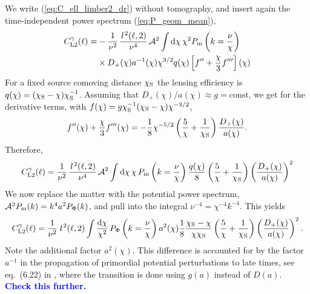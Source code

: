 \documentclass[fleqn,usenatbib]{mnras} %
\newcommand{\ellbar}{\hbox{\it \l}\,}
\newcommand{\pref}{{\cal A}}
\newcommand{\mk}[1]{{\bf\textcolor{blue}{#1}}}
\begin{document}
\begin{appendix}
We write (\ref{eq:C_ell_limber2_dr}) without tomography, and insert again the
time-independent power spectrum (\ref{eq:P_geom_mean}),
%
\begin{align}
  C^\gamma_{{\rm L2}}(\ell) = & - \frac 1 {\nu^2} \, \frac{\ellbar^2(\ell, 2)}{\nu^4} \, \pref^2
    \int {\rm d} \chi \, \chi^{2} P_{\rm m}\left(k = \frac\nu\chi\right)
    \nonumber \\
    & \times D_+(\chi) a^{-1}(\chi) \chi^{3/2} q(\chi) \left[ f^{\prime\prime} 
      + \frac{\chi}{3} f^{\prime\prime\prime} 
    \right](\chi)
  \label{eq:C_ell_limber2_dr_notomo}
\end{align}
%
For a fixed source comoving distance $\chi_{\rm S}$ the lensing efficiency is
$q(\chi) = (\chi_{\rm S} - \chi) \chi_{\rm S}^{-1}$. Assuming that
$D_+(\chi)/a(\chi) \approx g = \mbox{const}$, we get for the derivative terms,
with $f(\chi) = g \chi_{\rm S}^{-1} (\chi_{\rm S} - \chi) \chi^{-3/2}$,
%
\begin{equation}
  f^{\prime\prime}(\chi) + \frac{\chi}{3} f^{\prime\prime\prime}(\chi)
    = - \frac 1 8 \chi^{-5/2} \left( \frac 5 \chi
          + \frac 1 {\chi_{\rm S}} \right) \frac{D_+(\chi)}{a(\chi)}.
\end{equation}
%
Therefore,
%
\begin{align}
  C^\gamma_{{\rm L2}}(\ell) = \frac 1 {\nu^2} \, \frac{\ellbar^2(\ell, 2)}{\nu^4} \, \pref^2
    \int {\rm d} \chi \, \chi \, P_{\rm m}\left(k = \frac\nu\chi\right)
    \frac{q(\chi)}{8} \left( \frac 5 \chi + \frac 1 {\chi_{\rm S}} \right)
      \left(\frac{D_+(\chi)}{a(\chi)}\right)^2 
\end{align}
%
We now replace the matter with the potential power spectrum, ${\cal A}^2 P_{\rm m}(k) = k^{4} a^2 P_\Phi(k)$, and pull into the integral $\nu^{-4} = \chi^{-4} k^{-4}$. This yields
%
\begin{align}
  C^\gamma_{{\rm L2}}(\ell) = \frac 1 {\nu^2} \, \ellbar^2(\ell, 2)
    \int \frac{{\rm d} \chi}{\chi^2} \, P_\Phi\left(k = \frac\nu\chi\right)
    a^2(\chi) \frac{1}{8} \frac{\chi_{\rm S} - \chi}{\chi \chi_{\rm S}}
    \left( \frac 5 \chi + \frac 1 {\chi_{\rm S}} \right)
      \left(\frac{D_+(\chi)}{a(\chi)}\right)^2 .
\end{align}
%
Note the additional factor $a^2(\chi)$. This difference is accounted for by the
factor $a^{-1}$ in the propagation of primordial potential perturbations to
late times, see eq.~(6.22) in \cite{vande2012}, where the transition is done
using $g(a)$ instead of $D(a)$. \mk{Check this further.}



\end{appendix}
\end{document}

